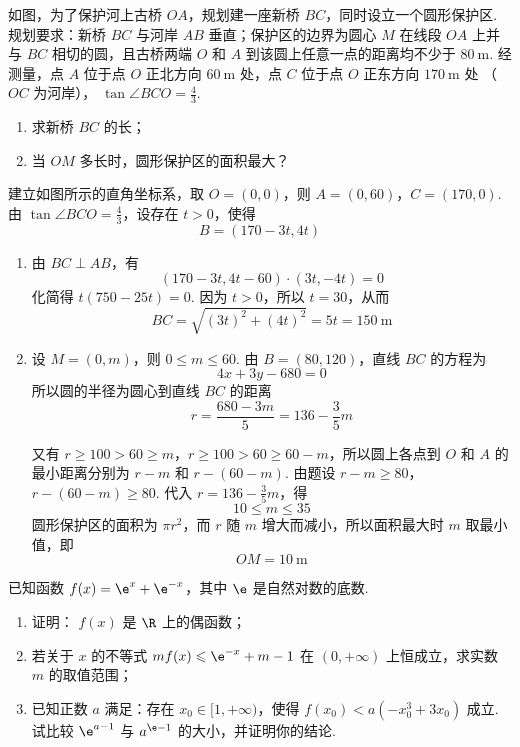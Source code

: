 \begin{problem}
如图，为了保护河上古桥 \(OA\)，规划建一座新桥 \(BC\)，同时设立一个圆形保护区. 规划要求：新桥 \(BC\) 与河岸 \(AB\) 垂直；保护区的边界为圆心 \(M\) 在线段 \(OA\) 上并与 \(BC\) 相切的圆，且古桥两端 \(O\) 和 \(A\) 到该圆上任意一点的距离均不少于 \(80 \mathrm{~m}\). 经测量，点 \(A\) 位于点 \(O\) 正北方向 \(60 \mathrm{~m}\) 处，点 \(C\) 位于点 \(O\) 正东方向 \(170 \mathrm{~m}\) 处 （\(OC\) 为河岸）， \(\tan \angle BCO = \frac{4}{3}\).

\begin{enumerate}
\item 求新桥 \(BC\) 的长；
\item 当 \(OM\) 多长时，圆形保护区的面积最大？
\end{enumerate}

\end{problem}

\begin{solution}
建立如图所示的直角坐标系，取 \(O=(0,0)\)，则 \(A=(0,60)\)，\(C=(170,0)\). 由 \(\tan\angle BCO=\frac43\)，设存在 \(t>0\)，使得
\[
B=(170-3t,4t)
\]

\begin{enumerate}
\item 由 \(BC\perp AB\)，有
\[
(170-3t,4t-60)\cdot(3t,-4t)=0
\]
化简得 \(t(750-25t)=0\). 因为 \(t>0\)，所以 \(t=30\)，从而
\[
BC=\sqrt{(3t)^2+(4t)^2}=5t=150 \mathrm{~m}
\]

\item 设 \(M=(0,m)\)，则 \(0\leqslant m\leqslant60\). 由 \(B=(80,120)\)，直线 \(BC\) 的方程为
\[
4x+3y-680=0
\]
所以圆的半径为圆心到直线 \(BC\) 的距离
\[
r=\frac{680-3m}{5}=136-\frac35m
\]

又有 \(r\geqslant100>60\geqslant m\)，\(r\geqslant100>60\geqslant60-m\)，所以圆上各点到 \(O\) 和 \(A\) 的最小距离分别为 \(r-m\) 和 \(r-(60-m)\). 由题设
\(r-m\geqslant80\)，\(r-(60-m)\geqslant80\).
代入 \(r=136-\frac35m\)，得
\[
10\leqslant m\leqslant35
\]
圆形保护区的面积为 \(\pi r^2\)，而 \(r\) 随 \(m\) 增大而减小，所以面积最大时 \(m\) 取最小值，即
\[
OM=10 \mathrm{~m}
\]
\end{enumerate}
\end{solution}

\begin{problem}
已知函数 \( f(x) = \e^{x} + \e^{-x} \)，其中 \( \e \) 是自然对数的底数.
\begin{enumerate}
\item 证明： \( f(x) \) 是 \(\R\) 上的偶函数；
\item 若关于 \(x\) 的不等式 \(m f(x) \leqslant \e^{-x} + m - 1\) 在 \((0, +\infty)\) 上恒成立，求实数 \(m\) 的取值范围；
\item 已知正数 \(a\) 满足：存在 \(x_0 \in [1, +\infty)\)，使得 \(f(x_0) < a(-x_0^3 + 3x_0)\) 成立. 试比较 \(\e^{a - 1}\) 与 \(a^{\e - 1}\) 的大小，并证明你的结论.
\end{enumerate}
\end{problem}

